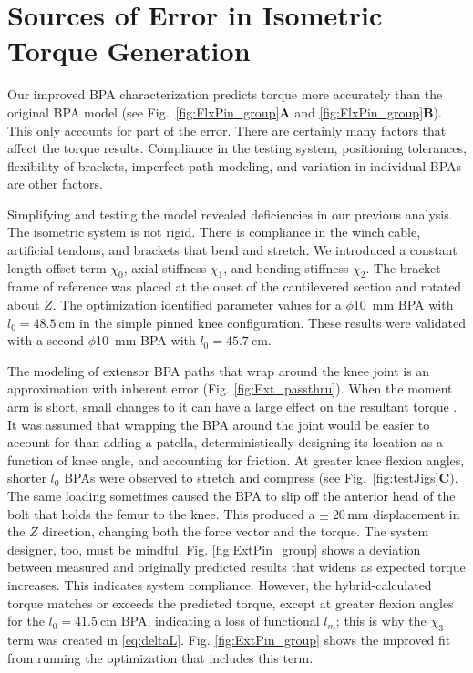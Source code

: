 \section{Sources of Error in Isometric Torque Generation}\label{sec:disc_error}

Our improved BPA characterization predicts torque more accurately than the original BPA model (see Fig.~\ref{fig:FlxPin_group}\textbf{A} and \ref{fig:FlxPin_group}\textbf{B}). This only accounts for part of the error. There are certainly many factors that affect the torque results. Compliance in the testing system, positioning tolerances, flexibility of brackets, imperfect path modeling, and variation in individual BPAs are other factors.

Simplifying and testing the model revealed deficiencies in our previous analysis. The isometric system is not rigid. There is compliance in the winch cable, artificial tendons, and brackets that bend and stretch. We introduced a constant length offset term $\chi_{0}$, axial stiffness $\chi_{1}$, and bending stiffness $\chi_{2}$. The bracket frame of reference was placed at the onset of the cantilevered section and rotated about $Z$.  The optimization identified parameter values for a $\phi$\qty{10}{\mm} BPA with $l_{0}=\qty{48.5}{\cm}$ in the simple pinned knee configuration. These results were validated with a second $\phi$\qty{10}{\mm} BPA with $l_{0}=\qty{45.7}{\cm}$.

The modeling of extensor BPA paths that wrap around the knee joint is an approximation with inherent error (Fig. \ref{fig:Ext_passthru}). When the moment arm is short, small changes to it can have a large effect on the resultant torque \citep{young_analyzing_2019}. It was assumed that wrapping the BPA around the joint would be easier to account for than adding a patella, deterministically designing its location as a function of knee angle, and accounting for friction. At greater knee flexion angles, shorter $l_{0}$ BPAs were observed to stretch and compress (see Fig.~\ref{fig:testJigs}\textbf{C}). The same loading sometimes caused the BPA to slip off the anterior head of the bolt that holds the femur to the knee. This produced a $\pm \; 20\,\text{mm}$ displacement in the $Z$ direction, changing both the force vector and the torque. The system designer, too, must be mindful. Fig. \ref{fig:ExtPin_group} shows a deviation between measured and originally predicted results that widens as expected torque increases. This indicates system compliance. However, the hybrid-calculated torque matches or exceeds the predicted torque, except at greater flexion angles for the $l_{0}=\qty{41.5}{\cm}$ BPA, indicating a loss of functional $l_m$; this is why the $\chi_{3}$ term was created in \eqref{eq:deltaL}. Fig. \ref{fig:ExtPin_group} shows the improved fit from running the optimization that includes this term.

